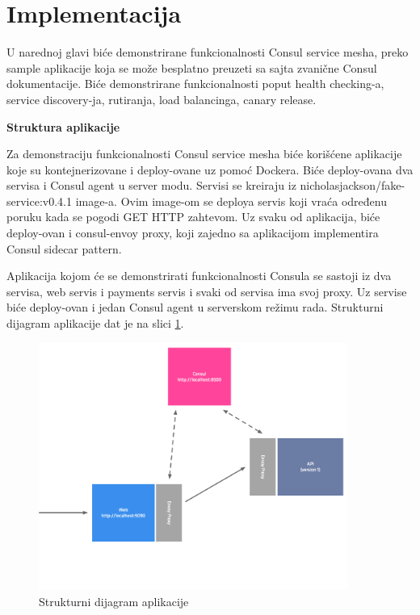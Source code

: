 \documentclass[a4paper,12pt]{report}
\begin{document}
\section{Implementacija }

U narednoj glavi biće demonstrirane funkcionalnosti Consul service mesha, preko sample aplikacije koja se može besplatno preuzeti sa sajta zvanične Consul dokumentacije.  Biće demonstrirane funkcionalnosti poput health checking-a, service discovery-ja, rutiranja, load balancinga, canary release.  \newline

\textbf{Struktura aplikacije}\newline

Za demonstraciju funkcionalnosti Consul service mesha biće korišćene aplikacije koje su kontejnerizovane i deploy-ovane uz pomoć Dockera. Biće deploy-ovana dva servisa i Consul agent u server modu. Servisi se kreiraju iz nicholasjackson/fake-service:v0.4.1 image-a.  Ovim image-om se deploya servis koji vraća određenu poruku kada se pogodi GET HTTP zahtevom. Uz svaku od aplikacija, biće deploy-ovan i consul-envoy proxy, koji zajedno sa aplikacijom implementira Consul sidecar pattern. \newline

Aplikacija kojom će se demonstrirati funkcionalnosti Consula se sastoji iz dva servisa, web servis i payments servis i svaki od servisa ima svoj proxy. Uz servise biće deploy-ovan i jedan Consul agent u serverskom režimu rada. Strukturni dijagram aplikacije dat je na slici \ref{fig:structure-diagram}.\newline

\begin{figure}[h]
    \centering
    \includegraphics[width=0.9\textwidth]{app_structure_diagram_start}
    \caption{Strukturni dijagram aplikacije}
    \label{fig:structure-diagram}
\end{figure} 
\end{document}
